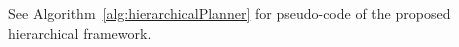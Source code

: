 \documentclass{article}
\begin{document}



See Algorithm~\ref{alg:hierarchicalPlanner} for pseudo-code of the proposed hierarchical framework.

\end{document}
